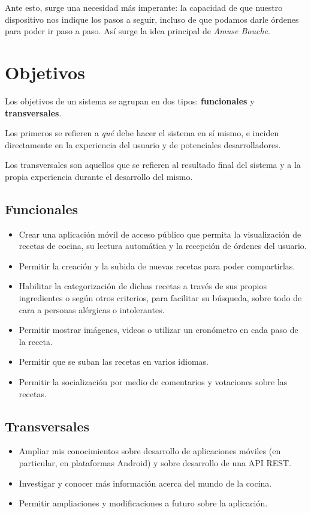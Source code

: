 Ante esto, surge una necesidad más imperante: la capacidad de que nuestro
dispositivo nos indique los pasos a seguir, incluso de que podamos darle
órdenes para poder ir paso a paso. Así surge la idea principal de
\textit{Amuse Bouche}.


\section{Objetivos}
\label{sec:objetivos}

Los objetivos de un sistema se agrupan en dos tipos: \textbf{funcionales} y
\textbf{transversales}.

Los primeros se refieren a \textit{qué} debe hacer el sistema en sí mismo,
e inciden directamente en la experiencia del usuario y de potenciales
desarrolladores.

Los transversales son aquellos que se refieren al resultado final del sistema
y a la propia experiencia durante el desarrollo del mismo.

\subsection{Funcionales}
\begin{itemize}
\item Crear una aplicación móvil de acceso público que permita la visualización
  de recetas de cocina, su lectura automática y la recepción de órdenes del
  usuario.
\item Permitir la creación y la subida de nuevas recetas para poder compartirlas.
\item Habilitar la categorización de dichas recetas a través de sus propios
  ingredientes o según otros criterios, para facilitar su búsqueda, sobre todo
  de cara a personas alérgicas o intolerantes.
\item Permitir mostrar imágenes, videos o utilizar un cronómetro en cada paso
  de la receta.
\item Permitir que se suban las recetas en varios idiomas.
\item Permitir la socialización por medio de comentarios y votaciones sobre las
  recetas.
\end{itemize}


\subsection{Transversales}
\begin{itemize}
\item Ampliar mis conocimientos sobre desarrollo de aplicaciones móviles (en
  particular, en plataformas Android) y sobre desarrollo de una API REST.
\item Investigar y conocer más información acerca del mundo de la cocina.
\item Permitir ampliaciones y modificaciones a futuro sobre la aplicación.
\end{itemize}


